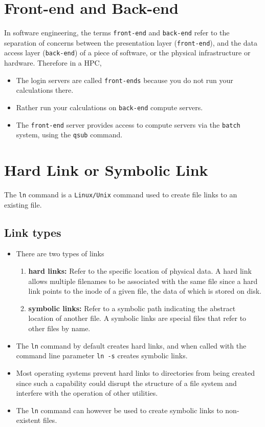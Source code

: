 \appendix

\section{Front-end and Back-end}
In software engineering, the terms \verb+front-end+ and \verb+back-end+ refer to the separation
of concerns between the presentation layer (\verb+front-end+), and the data access layer (\verb+back-end+) of a piece of software, 
or the physical infrastructure or hardware. Therefore in a HPC, 
\begin{itemize}
\item The login servers are called \verb+front-ends+ because you do not run your calculations there.
\item Rather run your calculations on \verb+back-end+ compute servers.
\item The \verb+front-end+ server provides access to compute servers via the \verb+batch+ system, using the \verb+qsub+ command.
\end{itemize}

\section{Hard Link or Symbolic Link}
The \verb+ln+ command is a \verb+Linux/Unix+ command used to create file links to an existing file. 
\subsection{Link types}
\begin{itemize}
\item There are two types of links
\begin{enumerate}
\item  \textbf{hard links:} Refer to the specific location of physical data.
A hard link allows multiple filenames to be associated with the same file since a hard link points to the 
inode of a given file, the data of which is stored on disk.
\item  \textbf{symbolic links:} Refer to a symbolic path indicating the abstract location of another file.
A symbolic links are special files that refer to other files by name.
\end{enumerate}
\item The \verb+ln+ command by default creates hard links, and when called with the command line parameter \verb+ln -s+
creates symbolic links.
\item Most operating systems prevent hard links to directories from being created since such a capability could disrupt
the structure of a file system and interfere with the operation of other utilities. 
\item The \verb+ln+ command can however be used to create symbolic links to  non-existent files. 
\end{itemize}

